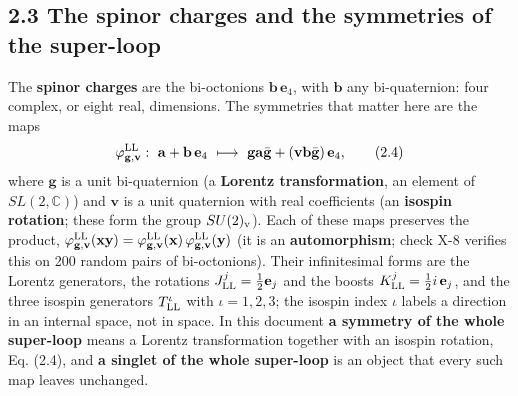 \documentclass[
  10pt,
]{article}
\begin{document}
\hypertarget{the-spinor-charges-and-the-symmetries-of-the-super-loop}{%
\subsection{2.3 The spinor charges and the symmetries of the
super-loop}\label{the-spinor-charges-and-the-symmetries-of-the-super-loop}}

The \textbf{spinor charges} are the bi-octonions
\(\mathbf b\,\mathbf e_4\), with \(\mathbf b\) any bi-quaternion: four
complex, or eight real, dimensions. The symmetries that matter here are
the maps
\[\varphi^{\rm LL}_{\mathbf g,\mathbf v}:\ \mathbf a+\mathbf b\,\mathbf e_4\ \longmapsto\ \mathbf g\mathbf a\bar{\mathbf g}+(\mathbf v\mathbf b\bar{\mathbf g})\,\mathbf e_4 , \tag{2.4}\]
where \(\mathbf g\) is a unit bi-quaternion (a \textbf{Lorentz
transformation}, an element of \(SL(2,\mathbb C)\)) and \(\mathbf v\) is
a unit quaternion with real coefficients (an \textbf{isospin rotation};
these form the group \(SU(2)_{\rm v}\)). Each of these maps preserves
the product,
\(\varphi^{\rm LL}_{\mathbf g,\mathbf v}(\mathbf x\mathbf y)=\varphi^{\rm LL}_{\mathbf g,\mathbf v}(\mathbf x)\,\varphi^{\rm LL}_{\mathbf g,\mathbf v}(\mathbf y)\)
(it is an \textbf{automorphism}; check X-8 verifies this on 200 random
pairs of bi-octonions). Their infinitesimal forms are the Lorentz
generators, the rotations \(J^j_{\rm LL}=\tfrac12\mathbf e_j\) and the
boosts \(K^j_{\rm LL}=\tfrac12i\,\mathbf e_j\), and the three isospin
generators \(T^\iota_{\rm LL}\) with \(\iota=1,2,3\); the isospin index
\(\iota\) labels a direction in an internal space, not in space. In this
document \textbf{a symmetry of the whole super-loop} means a Lorentz
transformation together with an isospin rotation, Eq. (2.4), and
\textbf{a singlet of the whole super-loop} is an object that every such
map leaves unchanged.
\end{document}

